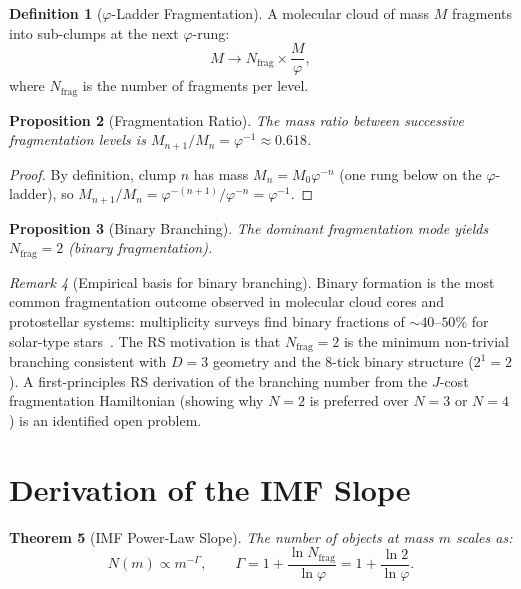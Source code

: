 \documentclass[12pt,a4paper]{article}
\newtheorem{theorem}{Theorem}[section]
\newtheorem{proposition}[theorem]{Proposition}
\theoremstyle{definition}
\newtheorem{definition}[theorem]{Definition}
\theoremstyle{remark}
\newtheorem{remark}[theorem]{Remark}
\begin{document}
\begin{definition}[$\varphi$-Ladder Fragmentation]
A molecular cloud of mass $M$ fragments into sub-clumps at the
next $\varphi$-rung:
\begin{equation}
  M \to N_{\mathrm{frag}} \times \frac{M}{\varphi},
\end{equation}
where $N_{\mathrm{frag}}$ is the number of fragments per level.
\end{definition}

\begin{proposition}[Fragmentation Ratio]
\label{thm:frag-ratio}
The mass ratio between successive fragmentation levels is
$M_{n+1}/M_n = \varphi^{-1} \approx 0.618$.
\end{proposition}

\begin{proof}
By definition, clump $n$ has mass $M_n = M_0 \varphi^{-n}$ (one
rung below on the $\varphi$-ladder), so
$M_{n+1}/M_n = \varphi^{-(n+1)}/\varphi^{-n} = \varphi^{-1}$.
\end{proof}

\begin{proposition}[Binary Branching]
The dominant fragmentation mode yields $N_{\mathrm{frag}} = 2$
(binary fragmentation).
\end{proposition}

\begin{remark}[Empirical basis for binary branching]
Binary formation is the most common fragmentation outcome observed
in molecular cloud cores and protostellar systems: multiplicity
surveys find binary fractions of $\sim 40$--$50\%$ for solar-type
stars~\cite{Duchene2013}.  The RS motivation is that $N_{\mathrm{frag}} = 2$
is the minimum non-trivial branching consistent with $D = 3$
geometry and the 8-tick binary structure ($2^1 = 2$).  A first-principles
RS derivation of the branching number from the $J$-cost fragmentation
Hamiltonian (showing why $N = 2$ is preferred over $N = 3$ or $N = 4$)
is an identified open problem.
\end{remark}

\section{Derivation of the IMF Slope}
\label{sec:slope}

\begin{theorem}[IMF Power-Law Slope]
\label{thm:slope}
The number of objects at mass $m$ scales as:
\begin{equation}
  N(m) \propto m^{-\Gamma}, \qquad
  \Gamma = 1 + \frac{\ln N_{\mathrm{frag}}}{\ln \varphi}
  = 1 + \frac{\ln 2}{\ln \varphi}.
\end{equation}
\end{theorem}
\end{document}
